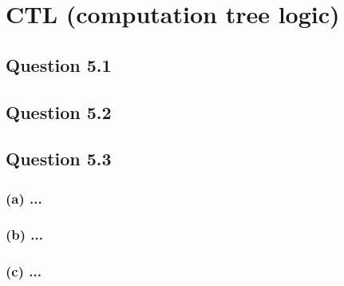 \section{CTL (computation tree logic)}
\subsection*{Question 5.1}
\subsection*{Question 5.2}
\subsection*{Question 5.3}
\subsubsection*{(a) \mdseries ...}
\subsubsection*{(b) \mdseries ...}
\subsubsection*{(c) \mdseries ...}
